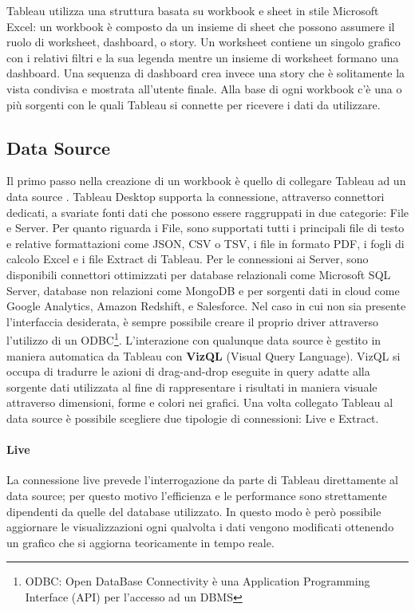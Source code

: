 Tableau utilizza una struttura basata su workbook e sheet in stile Microsoft Excel: un workbook è composto da un insieme di sheet che possono assumere il ruolo di worksheet, dashboard, o story. Un worksheet contiene un singolo grafico con i relativi filtri e la sua legenda mentre un insieme di worksheet formano una dashboard. Una sequenza di dashboard crea invece una story che è solitamente la vista condivisa e mostrata all'utente finale. Alla base di ogni workbook c'è una o più sorgenti con le quali Tableau si connette per ricevere i dati da utilizzare.

\subsection{Data Source}

Il primo passo nella creazione di un workbook è quello di collegare Tableau ad un data source \cite{data_tableau}. Tableau Desktop supporta la connessione, attraverso connettori dedicati, a svariate fonti dati che possono essere raggruppati in due categorie: File e Server. Per quanto riguarda i File, sono supportati tutti i principali file di testo e relative formattazioni come JSON, CSV o TSV, i file in formato PDF, i fogli di calcolo Excel e i file Extract di Tableau. Per le connessioni ai Server, sono disponibili connettori ottimizzati per database relazionali come Microsoft SQL Server, database non relazioni come MongoDB e per sorgenti dati in cloud come Google Analytics, Amazon Redshift, e Salesforce. Nel caso in cui non sia presente l'interfaccia desiderata, è sempre possibile creare il proprio driver attraverso l'utilizzo di un ODBC\footnote{ODBC: Open DataBase Connectivity è una Application Programming Interface (API) per l'accesso ad un DBMS}. L'interazione con qualunque data source è gestito in maniera automatica da Tableau con \textbf{VizQL} (Visual Query Language). VizQL si occupa di tradurre le azioni di drag-and-drop eseguite in query adatte alla sorgente dati utilizzata al fine di rappresentare i risultati in maniera visuale attraverso dimensioni, forme e colori nei grafici. Una volta collegato Tableau al data source è possibile scegliere due tipologie di connessioni: Live e Extract.

\paragraph{Live}

La connessione live prevede l'interrogazione da parte di Tableau direttamente al data source; per questo motivo l'efficienza e le performance sono strettamente dipendenti da quelle del database utilizzato. In questo modo è però possibile aggiornare le visualizzazioni ogni qualvolta i dati vengono modificati ottenendo un grafico che si aggiorna teoricamente in tempo reale.

